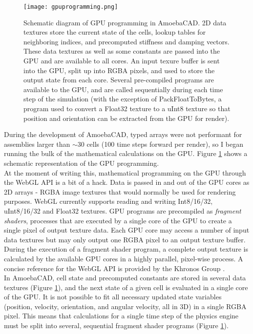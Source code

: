 {\begin{figure}
  \texttt{[image: gpuprogramming.png]}
  \caption{Schematic diagram of GPU programming in AmoebaCAD.  2D data textures store the current state of the cells, lookup tables for neighboring indices, and precomputed stiffness and damping vectors.  These data textures as well as some constants are passed into the GPU and are available to all cores.  An input texure buffer is sent into the GPU, split up into RGBA pixels, and used to store the output state from each core.  Several pre-compiled programs are available to the GPU, and are called sequentially during each time step of the simulation (with the exception of PackFloatToBytes, a program used to convert a Float32 texture to a uInt8 texture so that position and orientation can be extracted from the GPU for render).}
  \label{fig:gpuprogramming}
\end{figure}

During the development of AmoebaCAD, typed arrays were not performant for assemblies larger than $\sim$30 cells (100 time steps forward per render), so I began running the bulk of the mathematical calculations on the GPU.  Figure \ref{fig:gpuprogramming} shows a schematic representation of the GPU programming.\\

At the moment of writing this, mathematical programming on the GPU through the WebGL API is a bit of a hack.  Data is passed in and out of the GPU cores as 2D arrays - RGBA image textures that would normally be used for rendering purposes.  WebGL currently supports reading and writing Int8/16/32, uInt8/16/32 and Float32 textures.  GPU programs are precompiled as \textit{fragment shaders}, processes that are executed by a single core of the GPU to create a single pixel of output texture data.  Each GPU core may access a number of input data textures but may only output one RGBA pixel to an output texture buffer.  During the execution of a fragment shader program, a complete output texture is calculated by the available GPU cores in a highly parallel, pixel-wise process.  A concise reference for the WebGL API is provided by the Khronos Group \cite{Group}.\\

In AmoebaCAD, cell state and precomputed constants are stored in several data textures (Figure \ref{fig:gpuprogramming}), and the next state of a given cell is evaluated in a single core of the GPU.  It is not possible to fit all necessary updated state variables (position, velocity, orientation, and angular velocity, all in 3D) in a single RGBA pixel.  This means that calculations for a single time step of the physics engine must be split into several, sequential fragment shader programs (Figure \ref{fig:gpuprogramming}).\\

}
